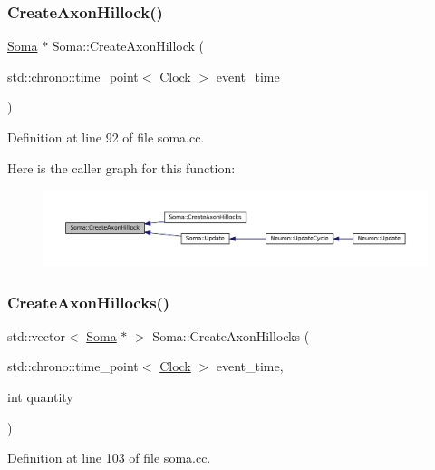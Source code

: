 \subsubsection{\texorpdfstring{Create\+Axon\+Hillock()}{CreateAxonHillock()}}
{\footnotesize\ttfamily \mbox{\hyperlink{class_soma}{Soma}} $\ast$ Soma\+::\+Create\+Axon\+Hillock (\begin{DoxyParamCaption}\item[{std\+::chrono\+::time\+\_\+point$<$ \mbox{\hyperlink{universe_8h_a0ef8d951d1ca5ab3cfaf7ab4c7a6fd80}{Clock}} $>$}]{event\+\_\+time }\end{DoxyParamCaption})}



Definition at line 92 of file soma.\+cc.

Here is the caller graph for this function\+:\nopagebreak
\begin{figure}[H]
\begin{center}
\leavevmode
\includegraphics[width=350pt]{class_soma_a42289635de3cb326bceeb5358b99c190_icgraph}
\end{center}
\end{figure}
\mbox{\label{class_soma_ab059a6d4a7dc41664d6d17794d09b260}} 
\subsubsection{\texorpdfstring{Create\+Axon\+Hillocks()}{CreateAxonHillocks()}}
{\footnotesize\ttfamily std\+::vector$<$ \mbox{\hyperlink{class_soma}{Soma}} $\ast$ $>$ Soma\+::\+Create\+Axon\+Hillocks (\begin{DoxyParamCaption}\item[{std\+::chrono\+::time\+\_\+point$<$ \mbox{\hyperlink{universe_8h_a0ef8d951d1ca5ab3cfaf7ab4c7a6fd80}{Clock}} $>$}]{event\+\_\+time,  }\item[{int}]{quantity }\end{DoxyParamCaption})}



Definition at line 103 of file soma.\+cc.

